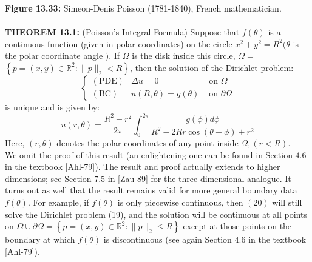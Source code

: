 \documentclass[../main.tex]{subfiles}
\begin{document}
\textbf{Figure 13.33:} Simeon-Denis Poisson (1781-1840), French 
mathematician.
\\
\\
\textbf{THEOREM 13.1:} (Poisson's Integral Formula) Suppose that $f(\theta)$ is a continuous function (given in polar coordinates) on the circle $x^{2}+y^{2}=R^{2}(\theta$ is the polar coordinate angle $)$. If $\Omega$ is the disk inside this circle, $\Omega=$ $\left\{p=(x, y) \in \mathbb{R}^{2}:\|p\|_{2}<R\right\}$, then the solution of the Dirichlet problem:
\begin{equation}
\left\{\begin{array}{lcl}
(\mathrm{PDE}) & \Delta u=0 & \text { on } \Omega \\
(\mathrm{BC}) & u(R, \theta)=g(\theta) & \text { on } \partial \Omega
\end{array}\right.
\end{equation}
is unique and is given by:
\begin{equation}
u(r, \theta)=\frac{R^{2}-r^{2}}{2 \pi} \int_{0}^{2 \pi} \frac{g(\phi) d \phi}{R^{2}-2 R r \cos (\theta-\phi)+r^{2}}
\end{equation}
Here, $(r, \theta)$ denotes the polar coordinates of any point inside $\Omega,(r<R)$.
\\
We omit the proof of this result (an enlightening one can be found in Section $4.6$ in the textbook [Ahl-79]). The result and proof actually extends to higher dimensions; see Section $7.5$ in [Zau-89] for the three-dimensional analogue. It turns out as well that the result remains valid for more general boundary data $f(\theta)$. For example, if $f(\theta)$ is only piecewise continuous, then $(20)$ will still solve the Dirichlet problem (19), and the solution will be continuous at all points on $\Omega \cup \partial \Omega=\left\{p=(x, y) \in \mathbb{R}^{2}:\|p\|_{2} \leq R\right\}$ except at those points on the boundary at which $f(\theta)$ is discontinuous (see again Section $4.6$ in the textbook [Ahl-79]). 
\end{document}
